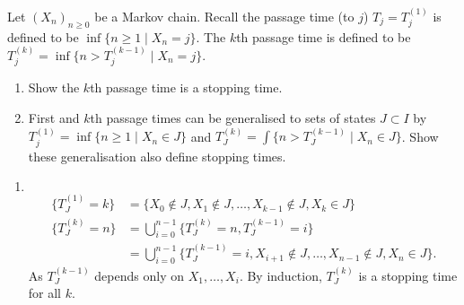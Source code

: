 \documentclass[10pt, a4paper]{article}
\begin{document}
\begin{problem}
    Let $(X_n)_{n \geq 0}$ be a Markov chain.
    Recall the passage time
    (to $j$)
    $T_j = T_{j}^{(1)}$ is defined to be $\inf\{n \geq 1 \mid X_n = j\}$.
    The $k$th passage time is defined to be $T_{j}^{(k)} = \inf\{n > T_{j}^{(k - 1)} \mid X_n = j\}$.

    \begin{enumerate}[label = (\roman*)]
        \item Show the $k$th passage time is a stopping time.

        \item First and $k$th passage times can be generalised to sets of states $J \subset I$ by $T_{j}^{(1)} = \inf\{n \geq 1 \mid X_n \in J\}$ and $T_{J}^{(k)} = \int\{n > T_{J}^{(k - 1)} \mid X_n \in J\}$.
        Show these generalisation also define stopping times.
    \end{enumerate}

    \begin{solution}\phantom{}
        \begin{enumerate}[label = (\roman*)]
            \item
            \[
            \]
            \begin{align*}
                \{T_{J}^{(1)} = k\} &= \{X_0 \notin J, X_1 \notin J, \dotsc, X_{k - 1} \notin J, X_k \in J\} \\
                \{T_{J}^{(k)} = n\} &= \bigcup_{i = 0}^{n - 1}\{T_{J}^{(k)} = n, T_{J}^{(k - 1)} = i\} \\
                &= \bigcup_{i = 0}^{n - 1}\{T_{J}^{(k - 1)} = i, X_{i + 1} \notin J, \dotsc, X_{n - 1} \notin J, X_n \in J\}.
            \end{align*}
            As $T_{J}^{(k - 1)}$ depends only on $X_1, \dotsc, X_i$.
            By induction,
            $T_{J}^{(k)}$ is a stopping time for all $k$.
        \end{enumerate}
    \end{solution}
\end{problem}
\end{document}
